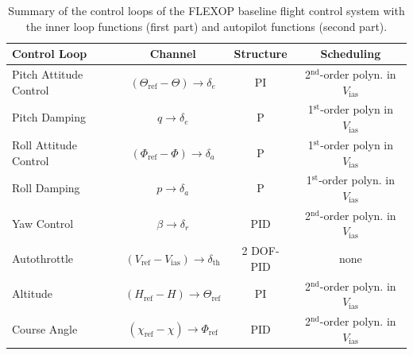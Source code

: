 \documentclass[aerospace,article,submit,moreauthors,pdftex,10pt,a4paper]{Definitions/mdpi}
\begin{document}
\begin{table}[H]
	\caption{Summary of the control loops of the FLEXOP baseline flight control system with the inner loop functions (first part) and autopilot functions (second part).}
	\centering
	\begin{tabular}{lccc}
		\toprule
		\textbf{Control Loop}     &                   \textbf{Channel}                    & \textbf{Structure} & \textbf{Scheduling} \\ \midrule
		Pitch Attitude Control            &   $(\Theta_\text{ref}-\Theta) \rightarrow \delta_e$   & PI &        2$^{\text{nd}}$-order polyn. in $V_{\text{ias}}$        \\
		Pitch Damping            &               $q \rightarrow \delta_e$                & P  &        1$^{\text{st}}$-order polyn in $V_{\text{ias}}$            \\
		Roll Attitude Control &     $(\Phi_\text{ref}-\Phi) \rightarrow \delta_a$     & P  &         1$^{\text{st}}$-order polyn in $V_{\text{ias}}$               \\
		 Roll Damping &               $p \rightarrow \delta_a$                & P  &         1$^{\text{st}}$-order polyn. in $V_{\text{ias}}$               \\
		Yaw Control  &             $\beta \rightarrow \delta_r$              &PID &         2$^{\text{nd}}$-order polyn. in $V_{\text{ias}}$              \\
		 \hline
		Autothrottle              & $(V_\text{ref}-V_\text{ias}) \rightarrow \delta_{\text{th}}$ &2 DOF-PID &   none       		\\
		Altitude                  &   $(H_\text{ref}-H) \rightarrow \Theta_\text{ref}$    & PI  &      2$^{\text{nd}}$-order polyn. in $V_{\text{ias}}$                 \\
		Course Angle              & $(\chi_\text{ref}-\chi) \rightarrow \Phi_\text{ref}$  & PID &     2$^{\text{nd}}$-order polyn. in $V_{\text{ias}}$                  \\
		\bottomrule
	\end{tabular}\label{tab:con}
\end{table}
\end{document}
